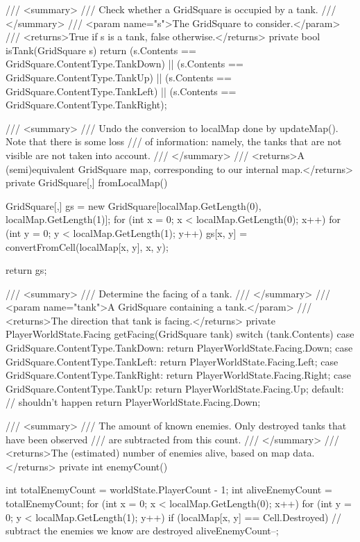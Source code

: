 \documentclass[11pt]{article}
\begin{document}
\begin{code}
{{        /// <summary>
        /// Check whether a GridSquare is occupied by a tank.
        /// </summary>
        /// <param name="s">The GridSquare to consider.</param>
        /// <returns>True if s is a tank, false otherwise.</returns>
        private bool isTank(GridSquare s)
        {
            return (s.Contents == GridSquare.ContentType.TankDown)
                || (s.Contents == GridSquare.ContentType.TankUp)
                || (s.Contents == GridSquare.ContentType.TankLeft)
                || (s.Contents == GridSquare.ContentType.TankRight);
        }

        /// <summary>
        /// Undo the conversion to localMap done by updateMap(). Note that there is some loss
        /// of information: namely, the tanks that are not visible are not taken into account.
        /// </summary>
        /// <returns>A (semi)equivalent GridSquare map, corresponding to our internal map.</returns>
        private GridSquare[,] fromLocalMap()
        {
            GridSquare[,] gs = new GridSquare[localMap.GetLength(0), localMap.GetLength(1)];
            for (int x = 0; x < localMap.GetLength(0); x++)
            {
                for (int y = 0; y < localMap.GetLength(1); y++)
                {
                    gs[x, y] = convertFromCell(localMap[x, y], x, y);
                }
            }

            return gs;
        }

        /// <summary>
        /// Determine the facing of a tank.
        /// </summary>
        /// <param name="tank">A GridSquare containing a tank.</param>
        /// <returns>The direction that tank is facing.</returns>
        private PlayerWorldState.Facing getFacing(GridSquare tank)
        {
            switch (tank.Contents)
            {
                case GridSquare.ContentType.TankDown:
                    return PlayerWorldState.Facing.Down;
                case GridSquare.ContentType.TankLeft:
                    return PlayerWorldState.Facing.Left;
                case GridSquare.ContentType.TankRight:
                    return PlayerWorldState.Facing.Right;
                case GridSquare.ContentType.TankUp:
                    return PlayerWorldState.Facing.Up;
                default:
                    // shouldn't happen
                    return PlayerWorldState.Facing.Down;
            }
        }

        /// <summary>
        /// The amount of known enemies. Only destroyed tanks that have been observed
        /// are subtracted from this count.
        /// </summary>
        /// <returns>The (estimated) number of enemies alive, based on map data.</returns>
        private int enemyCount()
        {
            int totalEnemyCount = worldState.PlayerCount - 1;
            int aliveEnemyCount = totalEnemyCount;
            for (int x = 0; x < localMap.GetLength(0); x++)
            {
                for (int y = 0; y < localMap.GetLength(1); y++)
                {
                    if (localMap[x, y] == Cell.Destroyed)
                    {
                        // subtract the enemies we know are destroyed
                        aliveEnemyCount--;
                    }
                }
            }

}}}
\end{code}
\end{document}
